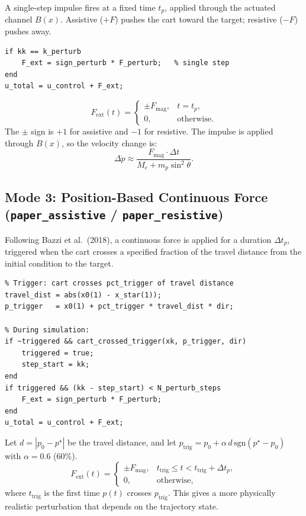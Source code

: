 \documentclass[11pt,a4paper]{article}
\begin{document}
A single-step impulse fires at a fixed time \(t_p\), applied through the actuated channel \(B(x)\).  Assistive (\(+F\)) pushes the cart toward the target; resistive (\(-F\)) pushes away.

\begin{lstlisting}
if kk == k_perturb
    F_ext = sign_perturb * F_perturb;   % single step
end
u_total = u_control + F_ext;
\end{lstlisting}

\begin{codemath}
\[
F_{\mathrm{ext}}(t) =
\begin{cases}
\pm F_{\mathrm{mag}}, & t = t_p, \\
0, & \text{otherwise}.
\end{cases}
\]
The \(\pm\) sign is \(+1\) for assistive and \(-1\) for resistive.  The impulse is applied through \(B(x)\), so the velocity change is:
\[
\Delta \dot p \approx \frac{F_{\mathrm{mag}} \cdot \Delta t}{M_c + m_p \sin^2\theta}.
\]
\end{codemath}

\subsection{Mode 3: Position-Based Continuous Force (\texttt{paper\_assistive} / \texttt{paper\_resistive})}

Following Bazzi et al.\ (2018), a continuous force is applied for a duration \(\Delta t_p\), triggered when the cart crosses a specified fraction of the travel distance from the initial condition to the target.

\begin{lstlisting}
% Trigger: cart crosses pct_trigger of travel distance
travel_dist = abs(x0(1) - x_star(1));
p_trigger   = x0(1) + pct_trigger * travel_dist * dir;

% During simulation:
if ~triggered && cart_crossed_trigger(xk, p_trigger, dir)
    triggered = true;
    step_start = kk;
end
if triggered && (kk - step_start) < N_perturb_steps
    F_ext = sign_perturb * F_perturb;
end
u_total = u_control + F_ext;
\end{lstlisting}

\begin{codemath}
Let \(d = |p_0 - p^\star|\) be the travel distance, and let \(p_{\mathrm{trig}} = p_0 + \alpha\, d\, \mathrm{sgn}(p^\star - p_0)\) with \(\alpha = 0.6\) (60\%).
\[
F_{\mathrm{ext}}(t) =
\begin{cases}
\pm F_{\mathrm{mag}}, & t_{\mathrm{trig}} \le t < t_{\mathrm{trig}} + \Delta t_p, \\
0, & \text{otherwise},
\end{cases}
\]
where \(t_{\mathrm{trig}}\) is the first time \(p(t)\) crosses \(p_{\mathrm{trig}}\).  This gives a more physically realistic perturbation that depends on the trajectory state.
\end{codemath}
\end{document}

